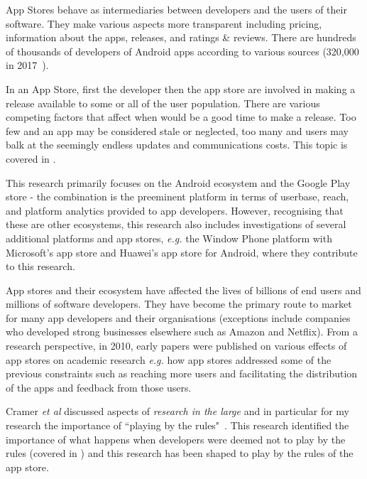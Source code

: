 App Stores behave as intermediaries between developers and the users of their software. They make various aspects more transparent including pricing, information about the apps, releases, and ratings \& reviews. There are hundreds of thousands of developers of Android apps according to various sources (320,000 in 2017~). %

In an App Store, first the developer then the app store are involved in making a release available to some or all of the user population. There are various competing factors that affect when would be a good time to make a release. Too few and an app may be considered stale or neglected, too many and users may balk at the seemingly endless updates and communications costs. This topic is covered in .  

This research primarily focuses on the Android ecosystem and the Google Play store - the combination is the preeminent platform in terms of userbase, reach, and platform analytics provided to app developers. However, recognising that these are other ecosystems, this research also includes investigations of several additional platforms and app stores, \emph{e.g.} the Window Phone platform with Microsoft's app store and Huawei's app store for Android, where they contribute to this research. 

App stores and their ecosystem have affected the lives of billions of end users and millions of software developers. They have become the primary route to market for many app developers and their organisations (exceptions include companies who developed strong businesses elsewhere such as Amazon and Netflix). 
From a research perspective, in 2010, early papers were published on various effects of app stores on academic research \emph{e.g.} how app stores addressed some of the previous constraints such as reaching more users and facilitating the distribution of the apps and feedback from those users. 

Cramer \emph{et al} discussed aspects of \emph{research in the large} and in particular for my research the importance of ``playing by the rules"~. This research identified the importance of what happens when developers were deemed not to play by the rules (covered in ) and this research has been shaped to play by the rules of the app store. %

